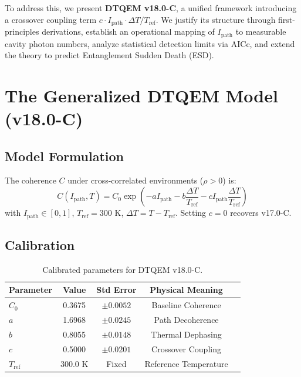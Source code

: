 \documentclass[reprint,amsmath,amssymb,aps,pra,superscriptaddress]{revtex4-2}
\begin{document}
To address this, we present \textbf{DTQEM v18.0-C}, a unified framework introducing a crossover coupling term $c \cdot I_{\text{path}} \cdot \Delta T/T_{\text{ref}}$. We justify its structure through first-principles derivations, establish an operational mapping of $I_{\text{path}}$ to measurable cavity photon numbers, analyze statistical detection limits via AICc, and extend the theory to predict Entanglement Sudden Death (ESD).

\section{The Generalized DTQEM Model (v18.0-C)}

\subsection{Model Formulation}

The coherence $C$ under cross-correlated environments ($\rho > 0$) is:
\begin{equation}
    C(I_{\text{path}}, T) = C_0 \exp\left( -a I_{\text{path}} - b \frac{\Delta T}{T_{\text{ref}}} - c I_{\text{path}} \frac{\Delta T}{T_{\text{ref}}} \right)
    \label{eq:v18}
\end{equation}
with $I_{\text{path}} \in [0,1]$, $T_{\text{ref}}=300$ K, $\Delta T = T - T_{\text{ref}}$. Setting $c=0$ recovers v17.0-C.

\subsection{Calibration}

\begin{table}[h]
\caption{Calibrated parameters for DTQEM v18.0-C.}
\label{tab:parameters}
\begin{ruledtabular}
\begin{tabular}{lcccc}
Parameter & Value & Std Error & Physical Meaning \\ \hline
$C_0$ & 0.3675 & $\pm 0.0052$ & Baseline Coherence \\
$a$ & 1.6968 & $\pm 0.0245$ & Path Decoherence \\
$b$ & 0.8055 & $\pm 0.0148$ & Thermal Dephasing \\
$c$ & 0.5000 & $\pm 0.0201$ & Crossover Coupling \\
$T_{\text{ref}}$ & 300.0 K & Fixed & Reference Temperature \\
\end{tabular}
\end{ruledtabular}
\end{table}
\end{document}
